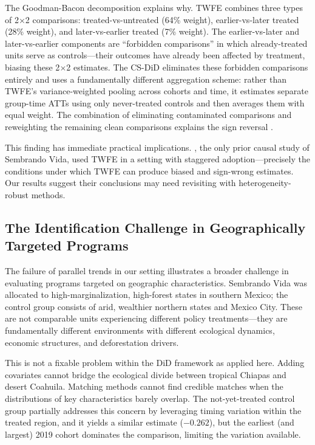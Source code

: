 \documentclass[12pt]{article}
\begin{document}
The Goodman-Bacon decomposition explains why. TWFE combines three types of 2$\times$2 comparisons: treated-vs-untreated (64\% weight), earlier-vs-later treated (28\% weight), and later-vs-earlier treated (7\% weight). The earlier-vs-later and later-vs-earlier components are ``forbidden comparisons'' in which already-treated units serve as controls---their outcomes have already been affected by treatment, biasing these 2$\times$2 estimates. The CS-DiD eliminates these forbidden comparisons entirely and uses a fundamentally different aggregation scheme: rather than TWFE's variance-weighted pooling across cohorts and time, it estimates separate group-time ATTs using only never-treated controls and then averages them with equal weight. The combination of eliminating contaminated comparisons and reweighting the remaining clean comparisons explains the sign reversal \citep{goodmanbacon2021difference, dechaisemartin2020two}.

This finding has immediate practical implications. \citet{perezponciano2025deforestation}, the only prior causal study of Sembrando Vida, used TWFE in a setting with staggered adoption---precisely the conditions under which TWFE can produce biased and sign-wrong estimates. Our results suggest their conclusions may need revisiting with heterogeneity-robust methods.

\subsection{The Identification Challenge in Geographically Targeted Programs}

The failure of parallel trends in our setting illustrates a broader challenge in evaluating programs targeted on geographic characteristics. Sembrando Vida was allocated to high-marginalization, high-forest states in southern Mexico; the control group consists of arid, wealthier northern states and Mexico City. These are not comparable units experiencing different policy treatments---they are fundamentally different environments with different ecological dynamics, economic structures, and deforestation drivers.

This is not a fixable problem within the DiD framework as applied here. Adding covariates cannot bridge the ecological divide between tropical Chiapas and desert Coahuila. Matching methods cannot find credible matches when the distributions of key characteristics barely overlap. The not-yet-treated control group partially addresses this concern by leveraging timing variation within the treated region, and it yields a similar estimate ($-0.262$), but the earliest (and largest) 2019 cohort dominates the comparison, limiting the variation available.
\end{document}
